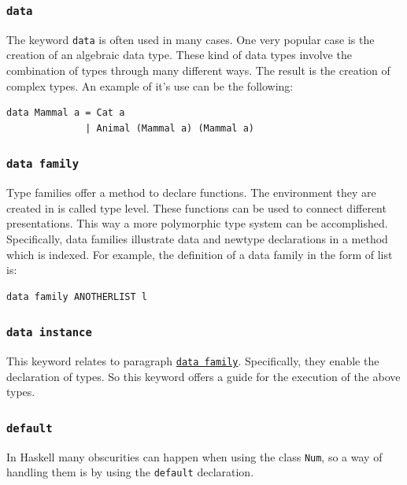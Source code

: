 \documentclass[a4paper, titlepage, twoside]{article}
\begin{document}
\subsubsection{\texttt{data}}
\label{sec:orgf6580fe}

The keyword \texttt{data} is often used in many cases. One very popular case is the creation of an algebraic data type. These kind of data types involve the combination of types through many different ways. The result is the creation of complex types. An example of it's use can be the following:

\begin{verbatim}
data Mammal a = Cat a
              | Animal (Mammal a) (Mammal a)
\end{verbatim}

\subsubsection{\texttt{data family}}
\label{sec:org43ed98a}

Type families offer a method to declare functions. The environment they are created in is called type level. These functions can be used to connect different presentations. This way a more polymorphic type system can be accomplished. Specifically, data families illustrate data and newtype declarations in a method which is indexed. For example, the definition of a data family in the form of list is:

\begin{verbatim}
data family ANOTHERLIST l
\end{verbatim}

\subsubsection{\texttt{data instance}}
\label{sec:org6cf773f}

This keyword relates to paragraph  \hyperref[sec:org43ed98a]{\texttt{data family}}. Specifically, they enable the declaration of types. So this keyword offers a guide for the execution of the above types.

\subsubsection{\texttt{default}}
\label{sec:orgcd5774f}

In Haskell many obscurities can happen when using the class \texttt{Num}, so a way of handling them is by using the \texttt{default} declaration.
\end{document}
